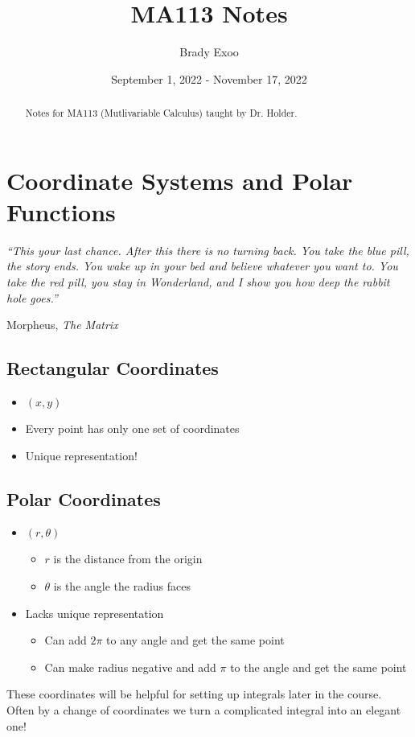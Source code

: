 \documentclass[12pt]{article}
\theoremstyle{plain} %
\theoremstyle{definition}
\theoremstyle{definition}
\theoremstyle{remark}
\begin{document}
\title{MA113 Notes}
\author{Brady Exoo}
\date{September 1, 2022 - November 17, 2022}
\maketitle

\begin{abstract}
Notes for MA113 (Mutlivariable Calculus) taught by Dr. Holder.
\end{abstract}

\tableofcontents

\eject

\section{Coordinate Systems and Polar Functions}
\epigraph{\itshape ``This your last chance. After this there is no turning back. You take the blue pill, the story ends. You wake up in your bed and believe whatever you want to. You take the red pill, you stay in Wonderland, and I show you how deep the rabbit hole goes.''}{Morpheus, \textit{The Matrix}}

\subsection{Rectangular Coordinates}
\begin{itemize}
    \item $(x,y)$
    \item Every point has only one set of coordinates
    \item Unique representation!
\end{itemize}

\subsection{Polar Coordinates}
\begin{itemize}
    \item $(r,\theta)$
    \begin{itemize}
        \item $r$ is the distance from the origin
        \item $\theta$ is the angle the radius faces
    \end{itemize}
    \item Lacks unique representation
    \begin{itemize}
        \item Can add $2\pi$ to any angle and get the same point
        \item Can make radius negative and add $\pi$ to the angle and get the same point
    \end{itemize}
\end{itemize}
These coordinates will be helpful for setting up integrals later in the course. Often by a change of coordinates we turn a complicated integral into an elegant one!
\end{document}
